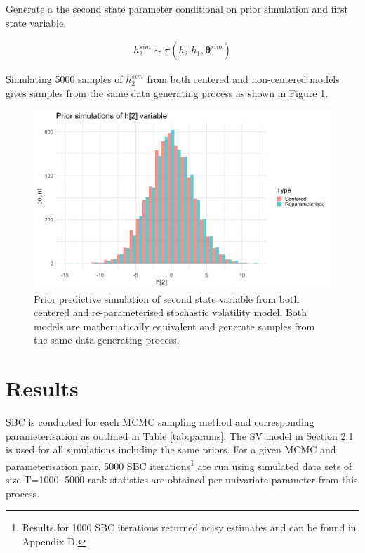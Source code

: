 \documentclass[12pt, a4paper]{article}
\begin{document}
        Generate a the second state parameter conditional on prior simulation and first state variable.

        $$
        \begin{aligned}
        h_2^{sim} \sim \pi (h_2|h_1, \boldsymbol{\theta}^{sim})
        \end{aligned}
        $$

        Simulating 5000 samples of $h_2^{sim}$ from both centered and non-centered models gives samples from the same data generating process as shown in Figure \ref{fig:priorpred}. 


        \begin{figure}[h]
            \centering
            \includegraphics[scale=0.1]{figures/ppc_h2.png}
            \caption{Prior predictive simulation of second state variable from both centered and re-parameterised stochastic volatility model. Both models are mathematically equivalent and generate samples from the same data generating process.}
            \label{fig:priorpred}
        \end{figure}
        



\section{Results}
    SBC is conducted for each MCMC sampling method and corresponding parameterisation as outlined in Table \ref{tab:params}. The SV model in Section 2.1 is used for all simulations including the same priors. For a given MCMC and parameterisation pair, 5000 SBC iterations\footnote{Results for 1000 SBC iterations returned noisy estimates and can be found in Appendix D.} are run using simulated data sets of size T=1000. 5000 rank statistics are obtained per univariate parameter from this process. 
    
\end{document}
